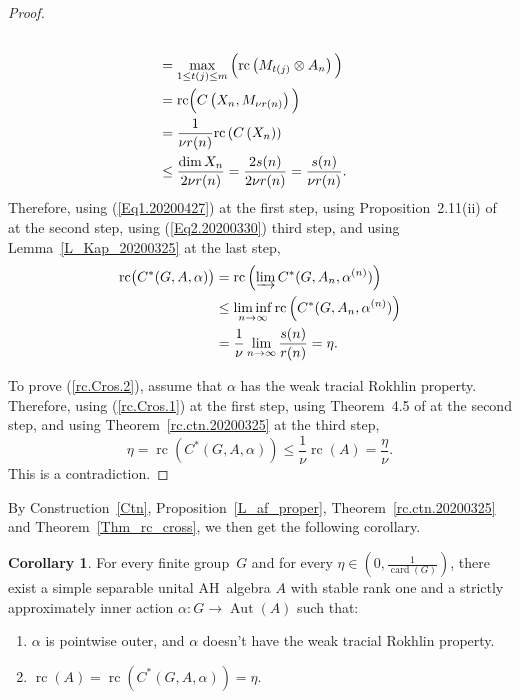 \documentclass[10pt]{amsart}
\numberwithin{equation}{section}
\theoremstyle{definition}
\newtheorem{cor}[thm]{Corollary}
\newcommand{\af}{\alpha}
\newcommand{\card}{{\operatorname{card}}}
\newcommand{\Aut}{{\operatorname{Aut}}}
\newcommand{\rc}{{\operatorname{rc}}}
\newcommand{\dirlim}{\varinjlim}
\begin{document}
\begin{proof}
\begin{align}
\\\notag
&= 
\max_{1\leq t(j)\leq m} \Big( \rc \left( M_{t(j)} \otimes A_n\right) \Big)
\\\notag
&=
 \rc \Big(C \left(X_{n}, M_{\nu r (n)}\right)\Big)
\\\notag
&= 
 \frac{1}{\nu r (n)}\rc \left(C \left(X_{n}\right)\right)
\\\notag
&\leq 
\frac{\dim X_n}{2 \nu r (n)}
 = 
 \frac{2 s(n)}{2 \nu r (n)}
 =
  \frac{s(n)}{\nu r (n)}.
\end{align}
Therefore, using (\ref{Eq1.20200427}) at the first step, using Proposition~2.11(ii) of \cite{AA20} at the second step, using (\ref{Eq2.20200330}) third step,
and using Lemma~\ref{L_Kap_20200325} at the last step,
\begin{align*}
\rc \big(C^*(G, A, \alpha)\big) 
&= 
\rc \left(\dirlim C^*(G, A_n, \alpha^{(n)})\right)
\\&
\leq
\liminf_{n \to \infty} \rc \left(C^*(G, A_n, \alpha^{(n)})\right)
\\&
=
\frac{1}{\nu} \lim_{ n \to \infty} \frac{s(n)}{r (n)} = \eta.
\end{align*}

To prove (\ref{rc.Cros.2}), assume that $\alpha$ has the weak tracial Rokhlin property. 
Therefore, using (\ref{rc.Cros.1}) at the first step, 
 using Theorem~4.5 of \cite{AGP19} at the second step,
 and using Theorem~\ref{rc.ctn.20200325} at the third step,
\[
\eta = \rc \left(C^*(G, A, \alpha)\right) \leq \frac{1}{\nu} \rc (A) =\frac{\eta}{\nu}.
\]
This is a contradiction.
\end{proof}
%
By Construction~\ref{Ctn}, Proposition~\ref{L_af_proper}, Theorem~\ref{rc.ctn.20200325} and Theorem~\ref{Thm_rc_cross}, 
we then get the following corollary.
\begin{cor}
For every finite group~$G$ and for every  $\eta \in \left(0, \frac{1}{\card (G)}\right)$, 
there exist a simple separable unital AH~algebra $A$ with  stable rank one 
and a strictly approximately  inner action $\alpha \colon G \to \Aut (A)$ such that:
\begin{enumerate}
\item\label{Cor.AH1}
$\af$ is pointwise outer, and $\alpha$ doesn't have the weak tracial Rokhlin property.
\item\label{Cor.AH2}
$\rc (A) =\rc \left(C^*(G, A, \alpha)\right)= \eta$.
\end{enumerate}
\end{cor}
\end{document}
